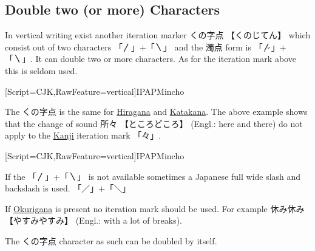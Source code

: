 \subsection{Double two (or more) Characters}

In vertical writing exist another iteration marker {くの字点} {【くのじてん】}
which consist out of two characters {「〳」+「〵」} and the {濁点} form is
{「〴」+「〵」}. It can double two or more characters. As for the iteration
mark above this is seldom used.

\begin{center}
[Script=CJK,RawFeature=vertical]{IPAPMincho}
\renewcommand{\rubysep}{-0.5ex}
\rotatebox{-90}{
\begin{minipage}{3.0cm} \CJKfamily{cjk-vert}
\Huge \ruby{所々}{ところ〴〵}
\end{minipage}
}
\end{center}

The {くの字点} is the same for \hyperref[sec:Hiragana]{Hiragana} and
\hyperref[sec:Katakana]{Katakana}. The above example shows that the change of
sound {所々} {【ところどころ】} (Engl.: here and there) do not apply to the
\hyperref[sec:Kanji]{Kanji} iteration mark {「々」}.

\begin{center}
[Script=CJK,RawFeature=vertical]{IPAPMincho}
\renewcommand{\rubysep}{-0.5ex}
\rotatebox{-90}{
\begin{minipage}{3.0cm} \CJKfamily{cjk-vert}
\Huge \ruby{色々}{イロ／＼}
\end{minipage}
}
\end{center}

If the {「〳」+「〵」}  is not available sometimes a Japanese full wide slash
and backslash is used. {「／」+「＼」} 

If \hyperref[sec:Okurigana]{Okurigana} is present no iteration mark should be
used. For example  {休み休み} {【やすみやすみ】} (Engl.: with a lot of breaks).


The {くの字点} character as such can be doubled by itself.



